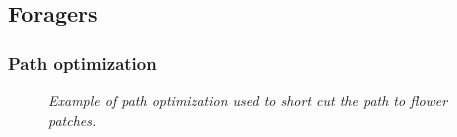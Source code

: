 \subsection{Foragers}
	\subsubsection{Path optimization}
		\label{chap:pathOptimization}
		
				\begin{figure}
					\centering
					\caption{\textit{Example of path optimization used to short cut the path to flower patches.}}
					\label{fig:pathOptimization}
				\end{figure}
		
